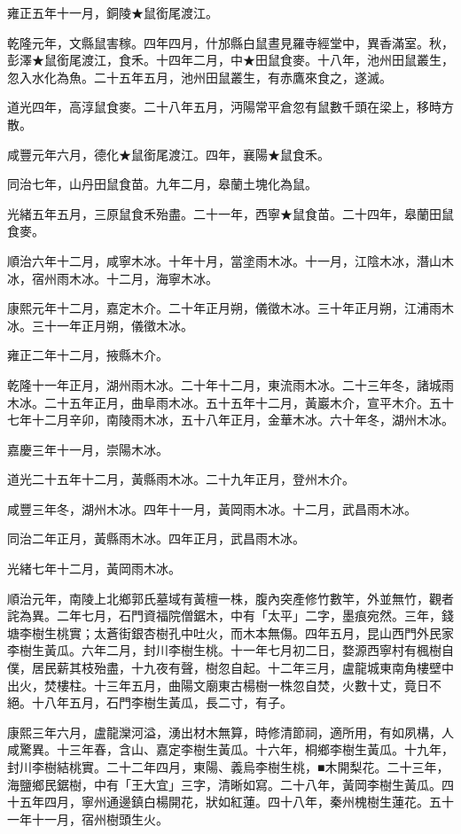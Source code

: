 \begin{pinyinscope}
雍正五年十一月，銅陵★鼠銜尾渡江。

乾隆元年，文縣鼠害稼。四年四月，什邡縣白鼠晝見羅寺經堂中，異香滿室。秋，彭澤★鼠銜尾渡江，食禾。十四年二月，中★田鼠食麥。十八年，池州田鼠叢生，忽入水化為魚。二十五年五月，池州田鼠叢生，有赤鷹來食之，遂滅。

道光四年，高淳鼠食麥。二十八年五月，沔陽常平倉忽有鼠數千頭在梁上，移時方散。

咸豐元年六月，德化★鼠銜尾渡江。四年，襄陽★鼠食禾。

同治七年，山丹田鼠食苗。九年二月，皋蘭土塊化為鼠。

光緒五年五月，三原鼠食禾殆盡。二十一年，西寧★鼠食苗。二十四年，皋蘭田鼠食麥。

順治六年十二月，咸寧木冰。十年十月，當塗雨木冰。十一月，江陰木冰，潛山木冰，宿州雨木冰。十二月，海寧木冰。

康熙元年十二月，嘉定木介。二十年正月朔，儀徵木冰。三十年正月朔，江浦雨木冰。三十一年正月朔，儀徵木冰。

雍正二年十二月，掖縣木介。

乾隆十一年正月，湖州雨木冰。二十年十二月，東流雨木冰。二十三年冬，諸城雨木冰。二十五年正月，曲阜雨木冰。五十五年十二月，黃巖木介，宣平木介。五十七年十二月辛卯，南陵雨木冰，五十八年正月，金華木冰。六十年冬，湖州木冰。

嘉慶三年十一月，崇陽木冰。

道光二十五年十二月，黃縣雨木冰。二十九年正月，登州木介。

咸豐三年冬，湖州木冰。四年十一月，黃岡雨木冰。十二月，武昌雨木冰。

同治二年正月，黃縣雨木冰。四年正月，武昌雨木冰。

光緒七年十二月，黃岡雨木冰。

順治元年，南陵上北鄉郭氏墓域有黃檀一株，腹內突產修竹數竿，外並無竹，觀者詫為異。二年七月，石門資福院僧鋸木，中有「太平」二字，墨痕宛然。三年，錢塘李樹生桃實；太蒼街銀杏樹孔中吐火，而木本無傷。四年五月，昆山西門外民家李樹生黃瓜。六年二月，封川李樹生桃。十一年七月初二日，婺源西寧村有楓樹自僕，居民薪其枝殆盡，十九夜有聲，樹忽自起。十二年三月，盧龍城東南角樓壁中出火，焚樓柱。十三年五月，曲陽文廟東古楊樹一株忽自焚，火數十丈，竟日不絕。十八年五月，石門李樹生黃瓜，長二寸，有子。

康熙三年六月，盧龍灤河溢，湧出材木無算，時修清節祠，適所用，有如夙構，人咸驚異。十三年春，含山、嘉定李樹生黃瓜。十六年，桐鄉李樹生黃瓜。十九年，封川李樹結桃實。二十二年四月，東陽、義烏李樹生桃，■木開梨花。二十三年，海鹽鄉民鋸樹，中有「王大宜」三字，清晰如寫。二十八年，黃岡李樹生黃瓜。四十五年四月，寧州通邊鎮白楊開花，狀如紅蓮。四十八年，秦州槐樹生蓮花。五十一年十一月，宿州樹頭生火。


\end{pinyinscope}
